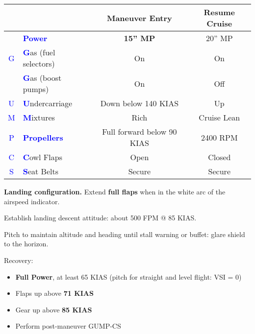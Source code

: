 \begin{table}[H]
\centering
\begin{tabular}{|c|l|c|c|}
\hline
                    &                                                 & \textbf{Maneuver Entry} & \textbf{Resume Cruise} \\ \hline
                    & \textcolor{blue}{\textbf{Power}}                & \textbf{15'' MP}        & 20'' MP                \\ \hline
\textcolor{blue}{G} & \textcolor{blue}{\textbf{G}}as (fuel selectors) & On                      & On                     \\
                    & \textcolor{blue}{\textbf{G}}as (boost pumps)    & On                      & Off                    \\ \hline
\textcolor{blue}{U} & \textcolor{blue}{\textbf{U}}ndercarriage        & Down below 140 KIAS     & Up                     \\ \hline
\textcolor{blue}{M} & \textcolor{blue}{\textbf{M}}ixtures             & Rich                    & Cruise Lean            \\ \hline
\textcolor{blue}{P} & \textcolor{blue}{\textbf{Propellers}}           & Full forward below 90 KIAS & 2400 RPM            \\ \hline
\textcolor{blue}{C} & \textcolor{blue}{\textbf{C}}owl Flaps           & Open                    & Closed                 \\ \hline
\textcolor{blue}{S} & \textcolor{blue}{\textbf{S}}eat Belts           & Secure                  & Secure                 \\ \hline
\end{tabular}
\end{table}

\textbf{Landing configuration.} Extend \textbf{full flaps} when in the white arc of the airspeed indicator.

Establish landing descent attitude: about 500 FPM @ 85 KIAS.

Pitch to maintain altitude and heading until stall warning or buffet: glare shield to the horizon. 

Recovery:
\begin{itemize}[label={}]
\item \textbf{Full Power}, at least 65 KIAS (pitch for straight and level flight: VSI = 0)
\item Flaps up above \textbf{71 KIAS}
\item Gear up above \textbf{85 KIAS}
\item Perform post-maneuver GUMP-CS
\end{itemize}

